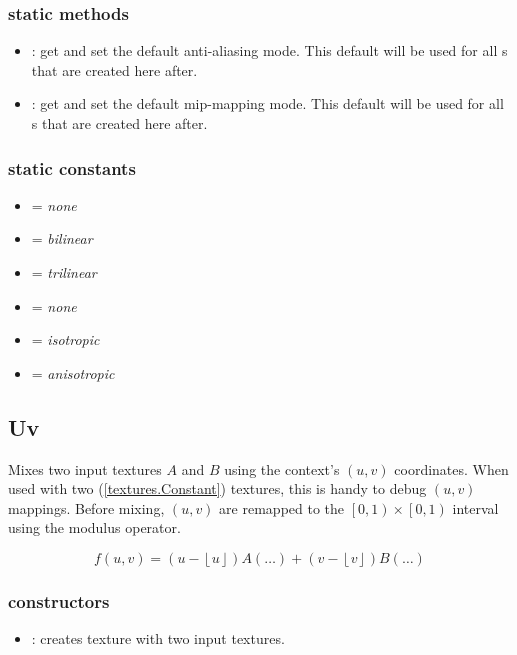 \subsubsection*{static methods}
\begin{itemize}
	\item {}:
		get and set the default anti-aliasing mode.  This default will be used for all s that are created here after.
	\item {}:
		get and set the default mip-mapping mode.  This default will be used for all s that are created here after.
\end{itemize}

\subsubsection*{static constants}
\begin{itemize}
	\item {} = \emph{none}
	\item {} = \emph{bilinear}
	\item {} = \emph{trilinear}
	\item {} = \emph{none}
	\item {} = \emph{isotropic}
	\item {} = \emph{anisotropic}
\end{itemize}





\subsection{Uv}

Mixes two input textures $A$ and $B$ using the context's $\left(u, v\right)$ coordinates.  When used with two (\ref{textures.Constant}) textures, this is handy to debug $\left(u, v\right)$ mappings.  Before mixing, $\left(u, v\right)$ are remapped to the $\left[0, 1\right) \times \left[0, 1\right)$ interval using the modulus operator.

\begin{equation}
	f\left(u, v\right) =
		\left(u - \left\lfloor u \right\rfloor\right) A\left(\ldots\right) +
		\left(v - \left\lfloor v \right\rfloor\right) B\left(\ldots\right)
\end{equation}

\subsubsection*{constructors}
\begin{itemize}
	\item {}:
		creates  texture with two input textures.
\end{itemize}

